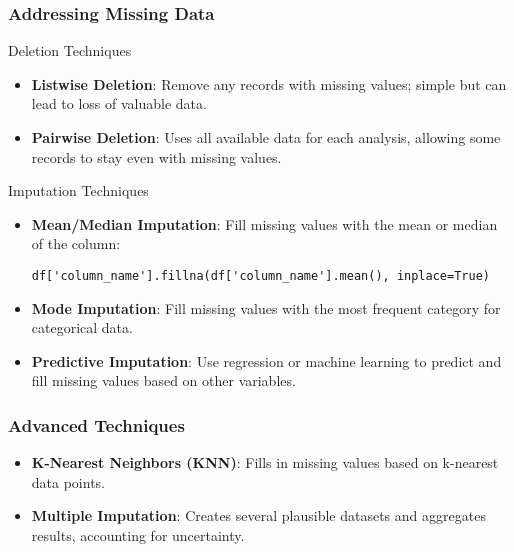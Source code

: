 \documentclass{beamer}
\begin{document}
\begin{frame}[fragile]
    \frametitle{Addressing Missing Data}
    \begin{block}{Deletion Techniques}
        \begin{itemize}
            \item \textbf{Listwise Deletion}: Remove any records with missing values; simple but can lead to loss of valuable data.
            \item \textbf{Pairwise Deletion}: Uses all available data for each analysis, allowing some records to stay even with missing values.
        \end{itemize}
    \end{block}
    \begin{block}{Imputation Techniques}
        \begin{itemize}
            \item \textbf{Mean/Median Imputation}: Fill missing values with the mean or median of the column:
            \begin{lstlisting}
df['column_name'].fillna(df['column_name'].mean(), inplace=True)
            \end{lstlisting}
            \item \textbf{Mode Imputation}: Fill missing values with the most frequent category for categorical data.
            \item \textbf{Predictive Imputation}: Use regression or machine learning to predict and fill missing values based on other variables.
        \end{itemize}
    \end{block}
\end{frame}

\begin{frame}[fragile]
    \frametitle{Advanced Techniques}
    \begin{itemize}
        \item \textbf{K-Nearest Neighbors (KNN)}: Fills in missing values based on k-nearest data points.
        \item \textbf{Multiple Imputation}: Creates several plausible datasets and aggregates results, accounting for uncertainty.
    \end{itemize}
\end{frame}
\end{document}

